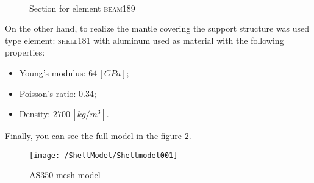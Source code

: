\begin{figure}[htb]
\centering
{} \quad
{}\\
\caption{Section for element \textsc{beam189}}
\label{fig:SectionGeometry}
\end{figure}

\noindent On the other hand, to realize the mantle covering the support structure was used type element: \textsc{shell181} with aluminum used as material with the following properties:
\begin{itemize}
\item Young's modulus: $64\,[GPa]$;
\item Poisson's ratio: $0.34$;
\item Density: $2700\,[kg/m^3]$.
\end{itemize}
Finally, you can see the full model in the figure \ref{fig:Ansys1Mesh}.

\begin{figure}[ht]
\centering
\texttt{[image: /ShellModel/Shellmodel001]}
\caption{AS350 mesh model}
\label{fig:Ansys1Mesh}
\end{figure}

